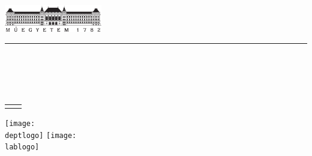 \newcommand{\HRule}{\rule{\linewidth}{1pt}}

\begin{titlepage}
\begin{center}

\includegraphics[height=1.2cm]{logos/BME1782.pdf}
\HRule\par
{\small \textsc{ \bfseries \schoolname \\
\facultyname \\
\doctoralname}}\par

\vfill

{
\Large
\makeatletter
\@title
\makeatother
} \par
\bigskip
\bookname \par
\bigskip
{
\normalsize
\theauthor\\[.5ex]
\authorprof
}\par

\vfill
\begin{tabular}{@{}p{3cm}l@{}}
	\supervisorname & \supervisor \\
\end{tabular}

\vspace{\fill}

\texttt{[image: \\deptlogo]} \hspace{2cm}
\texttt{[image: \\lablogo]} \par

\normalsize
\creationdate



\end{center}


\end{titlepage}
